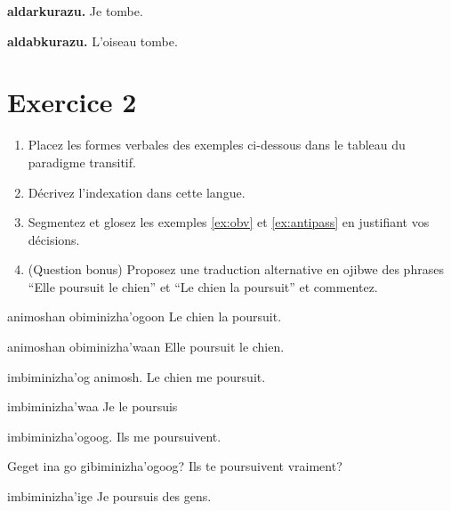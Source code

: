 \documentclass[oldfontcommands,twoside,a4paper,12pt]{article}
\newcommand{\ipa}[1]{{\phon\textbf{#1}}}
\begin{document}
\begin{exe}
\ex
\glt \ipa{Uzu} \ipa{aldarkurazu.}  
\glt Je tombe.
\end{exe}

\begin{exe}
\ex
\glt \ipa{žaqw'} \ipa{aldabkurazu.} 
\glt L'oiseau tombe.
\end{exe}
 

\section*{Exercice 2}
\begin{enumerate}
\item Placez les formes verbales des exemples ci-dessous dans le tableau du paradigme transitif.
\item Décrivez l'indexation dans cette langue.
 \item Segmentez et glosez les exemples \ref{ex:obv} et \ref{ex:antipass} en justifiant vos décisions.
\item (Question bonus) Proposez une traduction alternative en ojibwe des phrases ``Elle poursuit le chien'' et ``Le chien la poursuit'' et commentez.
\end{enumerate}
\begin{multicols}{2}
\begin{exe}
\ex \label{ex:obv}
\glt animoshan obiminizha'ogoon
\glt Le chien la poursuit.
\end{exe} 

\begin{exe}
\ex 
\glt animoshan obiminizha'waan 
\glt Elle poursuit le chien.
\end{exe} 
 
\begin{exe} 
\ex 
\glt imbiminizha'og animosh.
\glt Le chien me poursuit.
\end{exe}

\begin{exe}
\ex 
\glt imbiminizha'waa
\glt Je le poursuis
\end{exe}

\begin{exe}
\ex 
\glt imbiminizha'ogoog.
\glt Ils me poursuivent.
\end{exe}

\begin{exe}
\ex 
\glt Geget ina go gibiminizha'ogoog?
\glt Ils te poursuivent vraiment?
\end{exe}

\begin{exe}
\ex \label{ex:antipass}
\glt imbiminizha'ige
\glt Je poursuis des gens.
\end{exe}

 
\end{multicols}
\end{document}
